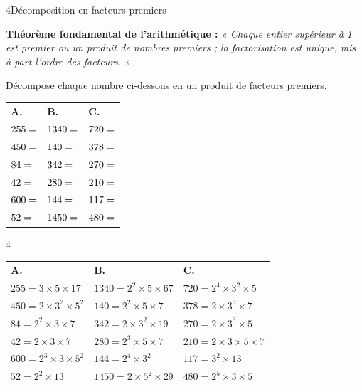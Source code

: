 \cleardoublepage
{}
{}

\begin{exercice}{4}{Décomposition en facteurs premiers}

\textbf{Théorème fondamental de l'arithmétique :} \textit{« Chaque entier supérieur à 1 est premier ou un produit de nombres premiers ; la factorisation est unique, mis à part l'ordre des facteurs. »}

\medskip
Décompose chaque nombre ci-dessous en un produit de facteurs premiers.

\medskip
\begin{tabular}{p{5cm} p{5cm} p{5cm}}
\textbf{A.} & \textbf{B.} & \textbf{C.} \\[6pt]
$255  = \dotfill$ & $1340 = \dotfill$ & $720  = \dotfill$ \\[8pt]
$450  = \dotfill$ & $140  = \dotfill$ & $378  = \dotfill$ \\[8pt]
$84   = \dotfill$ & $342  = \dotfill$ & $270  = \dotfill$ \\[8pt]
$42   = \dotfill$ & $280  = \dotfill$ & $210  = \dotfill$ \\[8pt]
$600  = \dotfill$ & $144  = \dotfill$ & $117  = \dotfill$ \\[8pt]
$52   = \dotfill$ & $1450 = \dotfill$ & $480  = \dotfill$ \\[8pt]
\end{tabular}

\end{exercice}
\begin{solution}{4}

\begin{tabular}{p{5cm} p{5cm} p{5cm}}
\textbf{A.} & \textbf{B.} & \textbf{C.} \\[6pt]
$255  = 3 \times 5 \times 17$          & $1340 = 2^2 \times 5 \times 67$  & $720  = 2^4 \times 3^2 \times 5$   \\[8pt]
$450  = 2 \times 3^2 \times 5^2$       & $140  = 2^2 \times 5 \times 7$   & $378  = 2 \times 3^3 \times 7$     \\[8pt]
$84   = 2^2 \times 3 \times 7$         & $342  = 2 \times 3^2 \times 19$  & $270  = 2 \times 3^3 \times 5$     \\[8pt]
$42   = 2 \times 3 \times 7$           & $280  = 2^3 \times 5 \times 7$   & $210  = 2 \times 3 \times 5 \times 7$ \\[8pt]
$600  = 2^3 \times 3 \times 5^2$       & $144  = 2^4 \times 3^2$          & $117  = 3^2 \times 13$             \\[8pt]
$52   = 2^2 \times 13$                 & $1450 = 2 \times 5^2 \times 29$  & $480  = 2^5 \times 3 \times 5$     \\[8pt]
\end{tabular}

\end{solution}


